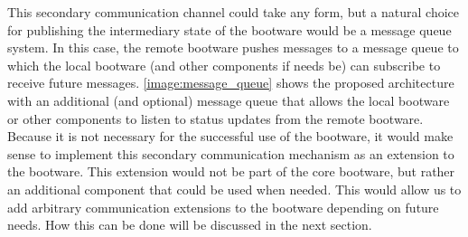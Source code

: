 This secondary communication channel could take any form, but a natural choice for publishing the intermediary state of the bootware would be a message queue system.
In this case, the remote bootware pushes messages to a message queue to which the local bootware (and other components if needs be) can subscribe to receive future messages.
\autoref{image:message_queue} shows the proposed architecture with an additional (and optional) message queue that allows the local bootware or other components to listen to status updates from the remote bootware.
Because it is not necessary for the successful use of the bootware, it would make sense to implement this secondary communication mechanism as an extension to the bootware.
This extension would not be part of the core bootware, but rather an additional component that could be used when needed.
This would allow us to add arbitrary communication extensions to the bootware depending on future needs.
How this can be done will be discussed in the next section.
